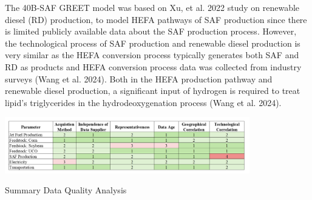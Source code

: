 \documentclass[12pt]{article}
\begin{document}
The 40B-SAF GREET model was based on Xu, et al. 2022 study on renewable diesel (RD) production, to model HEFA pathways of SAF production since there is limited publicly available data about the SAF production process. However, the technological process of SAF production and renewable diesel production is very similar as the HEFA conversion process typically generates both SAF and RD as products and HEFA conversion process data was collected from industry surveys (Wang et al. 2024). Both in the HEFA production pathway and renewable diesel production, a significant input of hydrogen is required to treat lipid’s triglycerides in the hydrodeoxygenation process (Wang et al. 2024). 

\begin{table}[H]
\centering
\includegraphics[width=0.8\textwidth]{Figures/dataqual.png} %
\caption{Summary Data Quality Analysis}
\label{table:perc}
\end{table}
\end{document}

